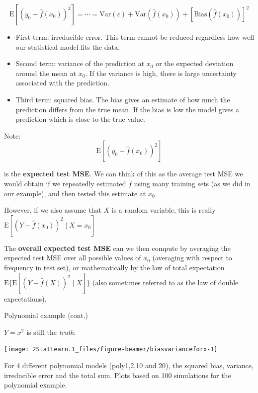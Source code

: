 \documentclass[ignorenonframetext,]{beamer}
\begin{document}
\begin{frame}

\[\text{E}[(y_0 - \hat{f}(x_0))^2]=\cdots=\text{Var}(\varepsilon) +  \text{Var}(\hat{f}(x_0))+[\text{Bias}(\hat{f}(x_0))]^2\]

\begin{itemize}
\item
  First term: irreducible error. This term cannot be reduced regardless
  how well our statistical model fits the data.
\item
  Second term: variance of the prediction at \(x_0\) or the expected
  deviation around the mean at \(x_0\). If the variance is high, there
  is large uncertainty associated with the prediction.
\item
  Third term: squared bias. The bias gives an estimate of how much the
  prediction differs from the true mean. If the bias is low the model
  gives a prediction which is close to the true value.
\end{itemize}

\end{frame}

\begin{frame}

Note: \[\text{E}[(y_0 - \hat{f}(x_0))^2]\]

is the \textbf{expected test MSE}. We can think of this as the average
test MSE we would obtain if we repeatedly estimated \(f\) using many
training sets (as we did in our example), and then tested this estimate
at \(x_0\).

However, if we also assume that \(X\) is a random variable, this is
really \(\text{E}[(Y - \hat{f}(x_0))^2 \mid X=x_0]\)

The \textbf{overall expected test MSE} can we then compute by averaging
the expected test MSE over all possible values of \(x_0\) (averaging
with respect to frequency in test set), or mathematically by the law of
total expectation \(\text{E} \{ \text{E}[(Y - \hat{f}(X))^2 \mid X]\}\)
(also sometimes referred to as the law of double expectations).

\end{frame}

\begin{frame}

\begin{block}{Polynomial example (cont.)}

\(Y=x^2\) is still the \emph{truth}.

\begin{center}\texttt{[image: 2StatLearn.1\_files/figure-beamer/biasvarianceforx-1]} \end{center}

For 4 different polynomial models (poly1,2,10 and 20), the squared bias,
variance, irreducible error and the total sum. Plots based on 100
simulations for the polynomial example.

\end{block}

\end{frame}
\end{document}
